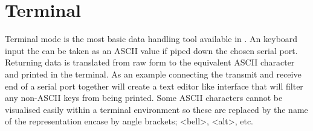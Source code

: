 
\section{Terminal}

Terminal mode is the most basic data handling tool available in \ds.
An keyboard input the can be taken as an ASCII value if piped down the chosen serial port.
Returning data is translated from raw form to the equivalent ASCII character and printed in the terminal.
As an example connecting the transmit and receive end of a serial port together will create a text editor like interface that will filter any non-ASCII keys from being printed.
Some ASCII characters cannot be visualised easily within a terminal environment so these are replaced by the name of the representation encase by angle brackets; <bell>, <alt>, etc.
